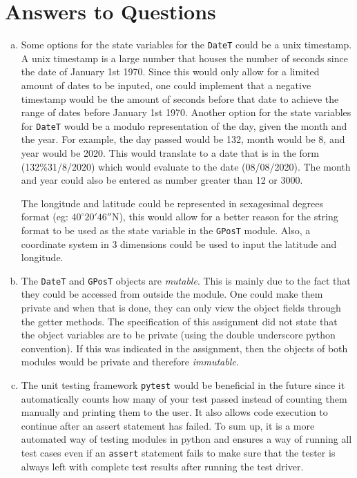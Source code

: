 \documentclass[12pt]{article}
\begin{document}
\section{Answers to Questions}

\begin{enumerate}[(a)]

\item Some options for the state variables for the \verb|DateT| could be a unix timestamp. A unix timestamp is a large number that houses the number of seconds since the date of January 1st 1970. Since this would only allow for a limited amount of dates to be inputed, one could implement that a negative timestamp would be the amount of seconds before that date to achieve the range of dates before January 1st 1970. Another option for the state variables for \verb|DateT| would be a modulo representation of the day, given the month and the year. For example, the day passed would be 132, month would be 8, and year would be 2020. This would translate to a date that is in the form (132\%31/8/2020) which would evaluate to the date (08/08/2020). The month and year could also be entered as number greater than 12 or 3000.

        The longitude and latitude could be represented in sexagesimal degrees format (eg: $40^{\circ} 20' 46''$N), this would allow for a better reason for the string format to be used as the state variable in the \verb|GPosT| module. Also, a coordinate system in 3 dimensions could be used to input the latitude and longitude.\\

\item The \verb|DateT| and \verb|GPosT| objects are \textit{mutable}. This is mainly due to the fact that they could be accessed from outside the module. One could make them private and when that is done, they can only view the object fields through the getter methods. The specification of this assignment did not state that the object variables are to be private (using the double underscore python convention). If this was indicated in the assignment, then the objects of both modules would be private and therefore \textit{immutable}.\\

\item The unit testing framework \verb|pytest| would be beneficial in the future since it automatically counts how many of your test passed instead of counting them manually and printing them to the user. It also allows code execution to continue after an assert statement has failed. To sum up, it is a more automated way of testing modules in python and ensures a way of running all test cases even if an \verb|assert| statement fails to make sure that the tester is always left with complete test results after running the test driver.\\


\end{enumerate}
\end{document}
